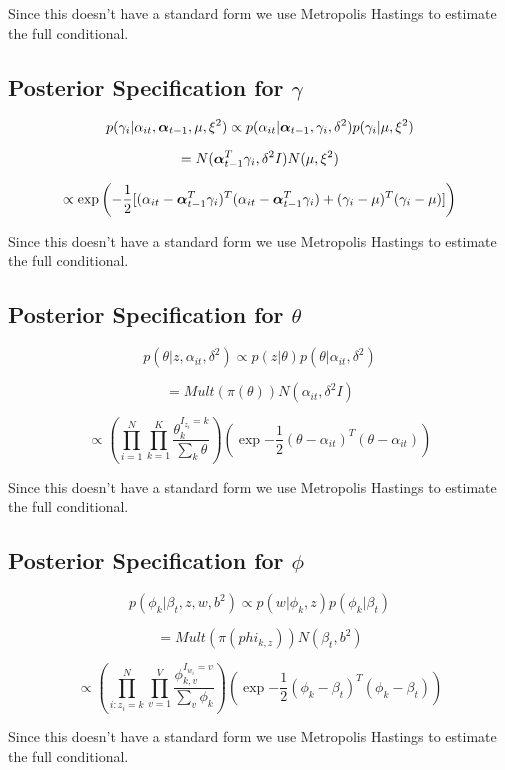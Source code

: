 \documentclass[a4paper]{article}
\begin{document}
Since this doesn't have a standard form we use Metropolis Hastings to estimate the full conditional.

\subsection{Posterior Specification for $\gamma$}

\[p(\gamma_i | \alpha_{it}, \text{\boldmath$\alpha$}_{t-1}, \mu, \xi^2) \propto p(\alpha_{it} | \text{\boldmath$\alpha$}_{t-1}, \gamma_i, \delta^2) p(\gamma_i | \mu, \xi^2)\]

\[= N(\text{\boldmath$\alpha$}_{t-1}^T \gamma_i, \delta^2I)N(\mu, \xi^2)\]

\[\propto \exp{\left(-\frac{1}{2}[(\alpha_{it} - \text{\boldmath$\alpha$}_{t-1}^T \gamma_i)^T(\alpha_{it} - \text{\boldmath$\alpha$}_{t-1}^T \gamma_i) + (\gamma_i - \mu)^T(\gamma_i - \mu)]\right)}\]

Since this doesn't have a standard form we use Metropolis Hastings to estimate the full conditional.

\subsection{Posterior Specification for $\theta$}

\[p(\theta | z, \alpha_{it}, \delta^2) \propto p(z | \theta) p(\theta | \alpha_{it}, \delta^2)\]

\[= Mult(\pi(\theta)) N(\alpha_{it}, \delta^2I)\]

\[\propto \left(\prod_{i=1}^N \prod_{k=1}^K \frac{\theta_k^{I_{z_i}=k}}{\sum_k \theta}\right) \left(\exp{-\frac{1}{2}(\theta - \alpha_{it})^T(\theta - \alpha_{it})}\right) \]

Since this doesn't have a standard form we use Metropolis Hastings to estimate the full conditional.

\subsection{Posterior Specification for $\phi$}

\[p(\phi_k | \beta_t, z, w, b^2) \propto p(w | \phi_k, z) p(\phi_k | \beta_t)\]

\[= Mult(\pi(phi_{k,z})) N(\beta_t, b^2)\]

\[\propto \left(\prod_{i:z_i=k}^N \prod_{v=1}^V \frac{\phi_{k, v}^{I_{w_i}=v}}{\sum_v \phi_k}\right) \left(\exp{-\frac{1}{2}(\phi_k - \beta_t)^T(\phi_k - \beta_t)}\right) \]

Since this doesn't have a standard form we use Metropolis Hastings to estimate the full conditional.
\end{document}
